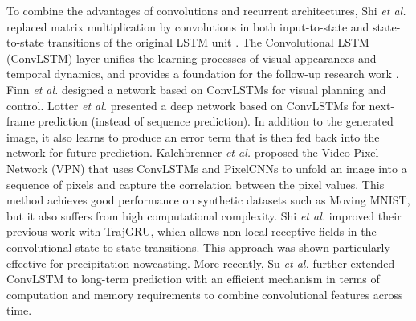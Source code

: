 \documentclass[10pt,journal,compsoc]{IEEEtran}
\begin{document}
To combine the advantages of convolutions and recurrent architectures, Shi \textit{et al.} \cite{shi2015convolutional} replaced matrix multiplication by convolutions in both input-to-state and state-to-state transitions of the original LSTM unit \cite{hochreiter1997long}. 
The Convolutional LSTM (ConvLSTM) layer unifies the learning processes of visual appearances and temporal dynamics, and provides a foundation for the follow-up research work \cite{patraucean2015spatio,Finn2016Unsupervised,Lotter2016Deep,Kalchbrenner2016Video,shi2017deep,wang2018predrnn++,byeon2018contextvp,oliu2018folded,xu2018structure,wang2019memory,wang2019eidetic,su2020convolutional}. 
Finn \textit{et al.} \cite{Finn2016Unsupervised} designed a network based on ConvLSTMs for visual planning and control. 
Lotter \textit{et al.} \cite{Lotter2016Deep} presented a deep network based on ConvLSTMs for next-frame prediction (instead of sequence prediction). In addition to the generated image, it also learns to produce an error term that is then fed back into the network for future prediction. 
Kalchbrenner \textit{et al.} \cite{Kalchbrenner2016Video} proposed the Video Pixel Network (VPN) that uses ConvLSTMs and PixelCNNs \cite{van2016conditional} to unfold an image into a sequence of pixels and capture the correlation between the pixel values. This method achieves good performance on synthetic datasets such as Moving MNIST, but it also suffers from high computational complexity. 
Shi \textit{et al.} \cite{shi2017deep} improved their previous work with TrajGRU, which allows non-local receptive fields in the convolutional state-to-state transitions. This approach was shown particularly effective for precipitation nowcasting.
More recently, Su \textit{et al.} \cite{su2020convolutional} further extended ConvLSTM to long-term prediction with an efficient mechanism in terms of
computation and memory requirements to combine convolutional features across time. 
\end{document}
